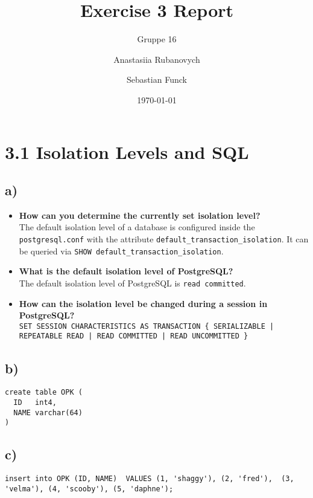 \documentclass[a4paper,english,abstract=on]{scrartcl}
\title{Exercise 3 Report}
\subtitle{Gruppe 16}
\author{Anastasiia Rubanovych\and Sebastian Funck}
\date{\today}
\begin{document}
\maketitle

\section*{3.1 Isolation Levels and SQL}
\subsection*{a)}
\begin{itemize}
	\item \textbf{How can you determine the currently set isolation level?}\\
	The default isolation level of a database is configured inside the \texttt{postgresql.conf} with the attribute \texttt{default\_transaction\_isolation}. It can be queried via \texttt{SHOW default\_transaction\_isolation}.
	
	\item \textbf{What is the default isolation level of PostgreSQL?}\\
	The default isolation level of PostgreSQL is \texttt{read committed}.
		
	\item \textbf{How can the isolation level be changed during a session in PostgreSQL?}\\
	\texttt{SET SESSION CHARACTERISTICS AS TRANSACTION \{ SERIALIZABLE | REPEATABLE READ | READ COMMITTED | READ UNCOMMITTED \}}
\end{itemize}

\subsection*{b)}
\begin{lstlisting}
create table OPK (
  ID   int4,
  NAME varchar(64)
)
\end{lstlisting}

\subsection*{c)}
\begin{lstlisting}
insert into OPK (ID, NAME) 	VALUES (1, 'shaggy'), (2, 'fred'), 	(3, 'velma'), (4, 'scooby'), (5, 'daphne');
\end{lstlisting}
\end{document}
